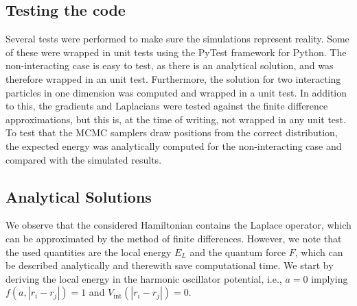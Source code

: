 \documentclass[11pt,a4paper]{article}
\numberwithin{equation}{section}
\begin{document}
\subsection{Testing the code}
Several tests were performed to make sure the simulations represent reality. Some of these were wrapped in unit tests using the PyTest framework for Python. The non-interacting case is easy to test, as there is an analytical solution, and was therefore wrapped in an unit test. Furthermore, the solution for two interacting particles in one dimension was computed and wrapped in a unit test. In addition to this, the gradients and Laplacians were tested against the finite difference approximations, but this is, at the time of writing, not wrapped in any unit test. To test that the MCMC samplers draw positions from the correct distribution, the expected energy was analytically computed for the non-interacting case and compared with the simulated results.

\subsection{Analytical Solutions}
%
%
We observe that the considered Hamiltonian contains the Laplace operator, which can be approximated by the method of finite differences.
%
However, we note that the used quantities are the local energy $E_L$ and the quantum force $F$, which can be described analytically and therewith save computational time. 
%
We start by deriving the local energy in the harmonic oscillator potential, i.e., $a=0$ implying $f(a,|r_i-r_j|)=1$ and $V_{\mathrm{int}}(|r_i-r_j|)=0$.
%
\end{document}
